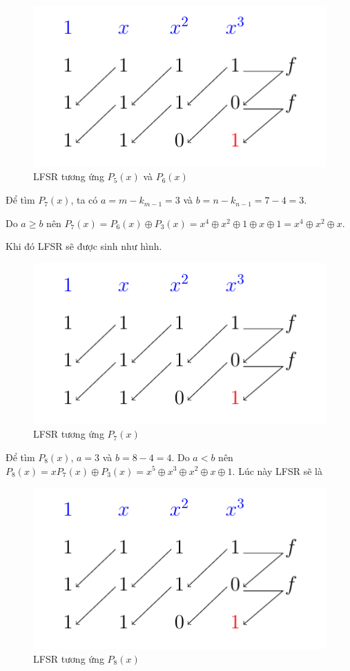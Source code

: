 \begin{example}
	\begin{figure}[htb]
		\centering
		\includegraphics[page=2]{figures/berlekamp_massey.pdf}
		\caption{LFSR tương ứng $P_5(x)$ và $P_6(x)$}
	\end{figure}
	
	Để tìm $P_7(x)$, ta có $a = m - k_{m-1} = 3$ và $b = n - k_{n-1} = 7 - 4 = 3$.
	
	Do $a \geqslant b$ nên $P_7(x) = P_6(x) \oplus P_3(x) = x^4 \oplus x^2 \oplus 1 \oplus x \oplus 1 = x^4 \oplus x^2 \oplus x$.

	Khi đó LFSR sẽ được sinh như hình.

	\begin{figure}[htb]
		\centering
		\includegraphics[page=3]{figures/berlekamp_massey.pdf}
		\caption{LFSR tương ứng $P_7(x)$}
	\end{figure}

	Để tìm $P_8(x)$, $a = 3$ và $b = 8 - 4 = 4$. Do $a < b$ nên $P_8(x) = x P_7(x) \oplus P_3(x) = x^5 \oplus x^3 \oplus x^2 \oplus x \oplus 1$. Lúc này LFSR sẽ là
	
	\begin{figure}[htb]
		\centering
		\includegraphics[page=4]{figures/berlekamp_massey.pdf}
		\caption{LFSR tương ứng $P_8(x)$}
	\end{figure}


\end{example}
